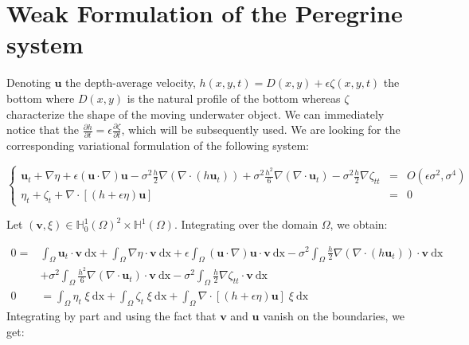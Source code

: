 \documentclass[11pt,a4paper]{article}
\begin{document}
\section{Weak Formulation of the Peregrine system}


Denoting $\mathbf{u}$ the depth-average velocity, $h(x,y,t) = D(x,y) + \epsilon \zeta(x,y,t)$ the bottom where  $D(x,y)$ is the natural profile of the bottom whereas $\zeta$ characterize the shape of the moving underwater object. We can immediately notice that the $\frac{\partial h}{\partial t} = \epsilon \frac{\partial \zeta}{\partial t}$, which will be subsequently used. We are looking for the corresponding variational formulation of the following system: 
\begin{center}
$\left\lbrace
\begin{array}{rll}
\displaystyle \mathbf{u}_t + \nabla \eta + \epsilon (\mathbf{u} \cdot \nabla)\mathbf{u} - \sigma^2\frac{h}{2}\nabla (\nabla \cdot (h \mathbf{u}_t)) + \sigma^2 \frac{h^2}{6}\nabla (\nabla \cdot \mathbf{u}_t) - \sigma^2\frac{h}{2}\nabla \zeta_{tt}  & = & \displaystyle O(\epsilon \sigma^2, \sigma^4) \\
\displaystyle \eta_t+\zeta_t + \nabla \cdot [(h+\epsilon\eta)\mathbf{u}] & = & 0
\end{array} \right.$
\end{center}

Let $(\mathbf{v},\xi) \in \mathbb{H}^1_0(\Omega)^2 \times \mathbb{H}^1(\Omega)$. Integrating over the domain $\Omega$, we obtain:   


\begin{equation}
			\begin{split}
0 = &\int_{\Omega} \! \mathbf{u}_t \cdot \mathbf{v} \: \mathrm{dx} + \int_{\Omega} \! \nabla \eta \cdot \mathbf{v} \: \mathrm{dx} + \epsilon \! \int_{\Omega} \! (\mathbf{u} \cdot \nabla ) \mathbf{u} \cdot \mathbf{v} \: \mathrm{dx} - \sigma^2 \! \int_{\Omega} \! \frac{h}{2} \nabla (\nabla \cdot (h \mathbf{u}_t)) \cdot \mathbf{v} \: \mathrm{dx} \\
&+ \sigma^2 \! \int_{\Omega} \! \frac{h^2}{6} \nabla (\nabla \cdot \mathbf{u}_t) \cdot \mathbf{v} \: \mathrm{dx} - \sigma^2 \! \int_{\Omega} \! \frac{h}{2} \nabla \zeta_{tt} \cdot \mathbf{v} \: \mathrm{dx}
 \\
\displaystyle 0 &= \int_{\Omega}\! \eta_t \; \xi \: \mathrm{dx} +\int_{\Omega}\! \zeta_t \; \xi \: \mathrm{dx}
+\int_{\Omega}\! \nabla \cdot [(h+\epsilon\eta) \mathbf{u}] \; \xi \: \mathrm{dx}
			\end{split}
\end{equation}
Integrating by part and using the fact that $\mathbf{v}$ and $\mathbf{u}$ vanish on the boundaries, we get: 
\end{document}
